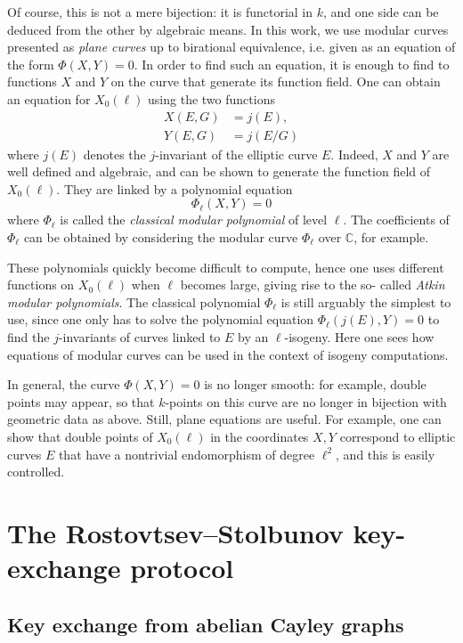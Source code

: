 \documentclass{article}
\newcommand{\C}{\mathbb{C}}
\begin{document}
Of course, this is not a mere bijection: it is functorial in $k$, and one side 
can be deduced from the other by algebraic means.
In this work, we use modular curves presented as \emph{plane curves} up to 
birational equivalence, i.e. given as an equation of the form
$\Phi(X, Y) = 0.$
In order to find such an equation, it is enough to find to functions $X$ and $Y$
 on the curve that generate its function field. One can obtain an equation for $
X_0(\ell)$ using the two functions
\[
\begin{aligned}
X(E, G) &= j(E), \\
Y(E, G) &= j(E/G)
\end{aligned}
\]
where $j(E)$ denotes the $j$-invariant of the elliptic curve $E$. Indeed, $X$ 
and $Y$ are well defined and algebraic, and can be shown to generate the 
function field of $X_0(\ell)$. They are linked by a polynomial equation
\[
\Phi_\ell(X, Y) = 0
\]
where $\Phi_\ell$ is called the \emph{classical modular polynomial} of level $
\ell$. The coefficients of $\Phi_\ell$ can be obtained by considering the 
modular curve $\Phi_\ell$ over $\C$, for example.

These polynomials quickly become difficult to compute, hence one uses different 
functions on $X_0(\ell)$ when $\ell$ becomes large, giving rise to the so-
called \emph{Atkin modular polynomials}. The classical polynomial $\Phi_\ell$ 
is still arguably the simplest to use, since one only has to solve the 
polynomial equation $\Phi_\ell(j(E), Y) = 0$ to find the $j$-invariants of 
curves linked to $E$ by an $\ell$-isogeny. Here one sees how equations of 
modular curves can be used in the context of isogeny computations.

In general, the curve $\Phi(X, Y) = 0$ is no longer smooth: for example, double 
points may appear, so that $k$-points on this curve are no longer in bijection 
with geometric data as above. Still, plane equations are useful. For example, 
one can show that double points of $X_0(\ell)$ in the coordinates $X, Y$ 
correspond to elliptic curves $E$ that have a nontrivial endomorphism of degree 
$\ell^2$, and this is easily controlled.


\section{The Rostovtsev--Stolbunov key-exchange protocol}

\subsection{Key exchange from abelian Cayley graphs}
\end{document}
